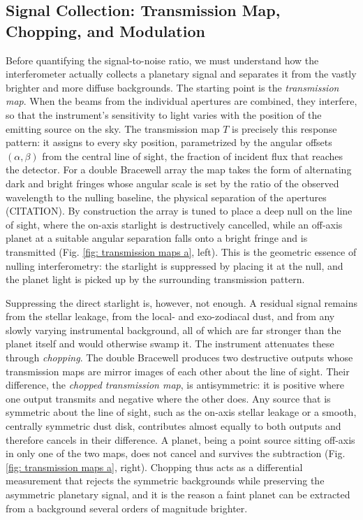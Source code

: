\documentclass[12pt,a4paper]{article}
\numberwithin{equation}{section}
\numberwithin{figure}{section}
\numberwithin{table}{section}
\begin{document}
\subsection{Signal Collection: Transmission Map, Chopping, and Modulation} \label{sec: intro: signal collection}
Before quantifying the signal-to-noise ratio, we must understand how the interferometer actually collects a planetary signal and separates it from the vastly brighter and more diffuse backgrounds. The starting point is the \textit{transmission map}. When the beams from the individual apertures are combined, they interfere, so that the instrument's sensitivity to light varies with the position of the emitting source on the sky. The transmission map $T$ is precisely this response pattern: it assigns to every sky position, parametrized by the angular offsets $(\alpha, \beta)$ from the central line of sight, the fraction of incident flux that reaches the detector. For a double Bracewell array the map takes the form of alternating dark and bright fringes whose angular scale is set by the ratio of the observed wavelength to the nulling baseline, the physical separation of the apertures (CITATION). By construction the array is tuned to place a deep null on the line of sight, where the on-axis starlight is destructively cancelled, while an off-axis planet at a suitable angular separation falls onto a bright fringe and is transmitted (Fig. \ref{fig: transmission maps a}, left). This is the geometric essence of nulling interferometry: the starlight is suppressed by placing it at the null, and the planet light is picked up by the surrounding transmission pattern.

Suppressing the direct starlight is, however, not enough. A residual signal remains from the stellar leakage, from the local- and exo-zodiacal dust, and from any slowly varying instrumental background, all of which are far stronger than the planet itself and would otherwise swamp it. The instrument attenuates these through \textit{chopping}. The double Bracewell produces two destructive outputs whose transmission maps are mirror images of each other about the line of sight. Their difference, the \textit{chopped transmission map}, is antisymmetric: it is positive where one output transmits and negative where the other does. Any source that is symmetric about the line of sight, such as the on-axis stellar leakage or a smooth, centrally symmetric dust disk, contributes almost equally to both outputs and therefore cancels in their difference. A planet, being a point source sitting off-axis in only one of the two maps, does not cancel and survives the subtraction (Fig. \ref{fig: transmission maps a}, right). Chopping thus acts as a differential measurement that rejects the symmetric backgrounds while preserving the asymmetric planetary signal, and it is the reason a faint planet can be extracted from a background several orders of magnitude brighter.
\end{document}

